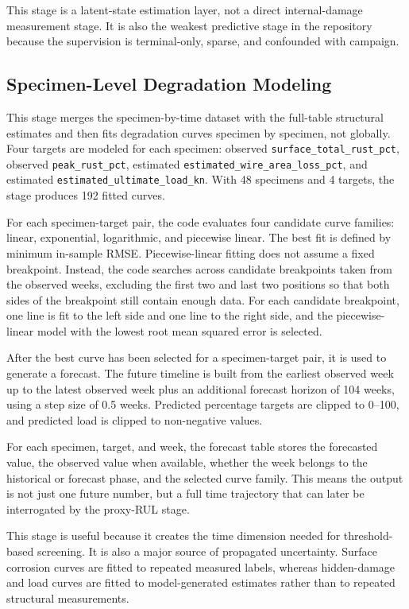 \documentclass[conference]{IEEEtran}
\begin{document}
This stage is a latent-state estimation layer, not a direct internal-damage measurement stage. It is also the weakest predictive stage in the repository because the supervision is terminal-only, sparse, and confounded with campaign.

\subsection{Specimen-Level Degradation Modeling}
This stage merges the specimen-by-time dataset with the full-table structural estimates and then fits degradation curves specimen by specimen, not globally. Four targets are modeled for each specimen: observed \texttt{surface\_total\_rust\_pct}, observed \texttt{peak\_rust\_pct}, estimated \texttt{estimated\_wire\_area\_loss\_pct}, and estimated \texttt{estimated\_ultimate\_load\_kn}. With 48 specimens and 4 targets, the stage produces 192 fitted curves.

For each specimen-target pair, the code evaluates four candidate curve families: linear, exponential, logarithmic, and piecewise linear. The best fit is defined by minimum in-sample RMSE. Piecewise-linear fitting does not assume a fixed breakpoint. Instead, the code searches across candidate breakpoints taken from the observed weeks, excluding the first two and last two positions so that both sides of the breakpoint still contain enough data. For each candidate breakpoint, one line is fit to the left side and one line to the right side, and the piecewise-linear model with the lowest root mean squared error is selected.

After the best curve has been selected for a specimen-target pair, it is used to generate a forecast. The future timeline is built from the earliest observed week up to the latest observed week plus an additional forecast horizon of 104 weeks, using a step size of 0.5 weeks. Predicted percentage targets are clipped to 0--100, and predicted load is clipped to non-negative values.

For each specimen, target, and week, the forecast table stores the forecasted value, the observed value when available, whether the week belongs to the historical or forecast phase, and the selected curve family. This means the output is not just one future number, but a full time trajectory that can later be interrogated by the proxy-RUL stage.

This stage is useful because it creates the time dimension needed for threshold-based screening. It is also a major source of propagated uncertainty. Surface corrosion curves are fitted to repeated measured labels, whereas hidden-damage and load curves are fitted to model-generated estimates rather than to repeated structural measurements.
\end{document}
